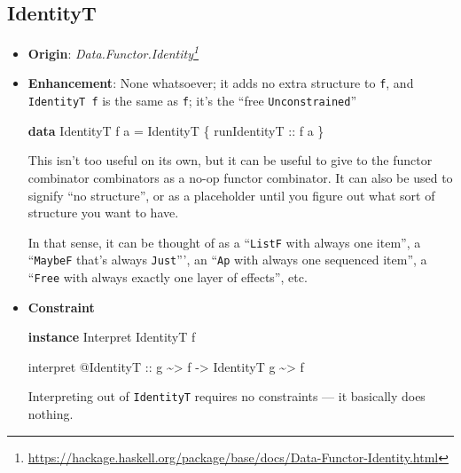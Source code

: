 \documentclass[]{article}
\newenvironment{Shaded}{}{}
\newcommand{\DataTypeTok}[1]{\textcolor[rgb]{0.56,0.13,0.00}{#1}}
\newcommand{\KeywordTok}[1]{\textcolor[rgb]{0.00,0.44,0.13}{\textbf{#1}}}
\newcommand{\NormalTok}[1]{#1}
\newcommand{\OperatorTok}[1]{\textcolor[rgb]{0.40,0.40,0.40}{#1}}
\newcommand{\OtherTok}[1]{\textcolor[rgb]{0.00,0.44,0.13}{#1}}
\renewcommand{\href}[2]{#2\footnote{\url{#1}}}
\begin{document}
\subsection{IdentityT}\label{identityt}

\begin{itemize}
\item
  \textbf{Origin}:
  \emph{\href{https://hackage.haskell.org/package/base/docs/Data-Functor-Identity.html}{Data.Functor.Identity}}
\item
  \textbf{Enhancement}: None whatsoever; it adds no extra structure to
  \texttt{f}, and \texttt{IdentityT\ f} is the same as \texttt{f}; it's the
  ``free \texttt{Unconstrained}''

\begin{Shaded}
\begin{Highlighting}[]
\KeywordTok{data} \DataTypeTok{IdentityT}\NormalTok{ f a }\OtherTok{=} \DataTypeTok{IdentityT}\NormalTok{ \{}\OtherTok{ runIdentityT ::}\NormalTok{ f a \}}
\end{Highlighting}
\end{Shaded}

  This isn't too useful on its own, but it can be useful to give to the functor
  combinator combinators as a no-op functor combinator. It can also be used to
  signify ``no structure'', or as a placeholder until you figure out what sort
  of structure you want to have.

  In that sense, it can be thought of as a ``\texttt{ListF} with always one
  item'', a ``\texttt{MaybeF} that's always \texttt{Just}''', an ``\texttt{Ap}
  with always one sequenced item'', a ``\texttt{Free} with always exactly one
  layer of effects'', etc.
\item
  \textbf{Constraint}

\begin{Shaded}
\begin{Highlighting}[]
\KeywordTok{instance} \DataTypeTok{Interpret} \DataTypeTok{IdentityT}\NormalTok{ f}

\NormalTok{interpret }\OperatorTok{@}\DataTypeTok{IdentityT}
\OtherTok{    ::}\NormalTok{ g }\OperatorTok{\textasciitilde{}\textgreater{}}\NormalTok{ f}
    \OtherTok{{-}\textgreater{}} \DataTypeTok{IdentityT}\NormalTok{ g }\OperatorTok{\textasciitilde{}\textgreater{}}\NormalTok{ f}
\end{Highlighting}
\end{Shaded}

  Interpreting out of \texttt{IdentityT} requires no constraints --- it
  basically does nothing.
\end{itemize}
\end{document}

